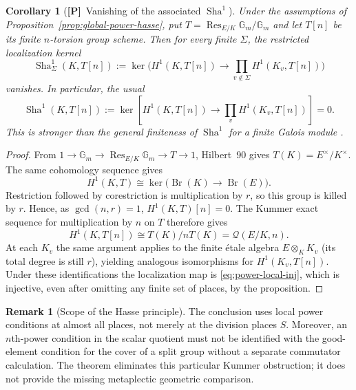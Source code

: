\documentclass[11pt]{article}
\newcommand{\Sha}{\operatorname{Sha}}
\newcommand{\Ptag}{\textnormal{\textbf{[P]}}}
\theoremstyle{plain}
\newtheorem{corollary}[theorem]{Corollary}
\theoremstyle{definition}
\newtheorem{remark}[theorem]{Remark}
\begin{document}
\begin{corollary}[\Ptag\ Vanishing of the associated \texorpdfstring{$\Sha^1$}{Sha-1}]\label{cor:sha-power}
Under the assumptions of Proposition~\ref{prop:global-power-hasse},
put $T=\operatorname{Res}_{E/K}\mathbb G_m/\mathbb G_m$ and
let $T[n]$ be its finite $n$-torsion group scheme. Then for every finite $\Sigma$, the restricted localization kernel
\[\Sha^1_{\Sigma}(K,T[n]):=\ker\bigl(H^1(K,T[n])\to\prod_{v\notin\Sigma}H^1(K_v,T[n])\bigr)\]
vanishes. In particular, the usual
\begin{equation}\label{eq:sha-zero}
\Sha^1(K,T[n]):=
\ker\left[H^1(K,T[n])\longrightarrow
                \prod_v H^1(K_v,T[n])\right]=0.
\end{equation}
This is stronger than the general
finiteness of $\Sha^1$ for a finite Galois module
\cite[Chapter~I, \S4]{MilneADT}.
\end{corollary}
\begin{proof}
From $1\to\mathbb G_m\to\operatorname{Res}_{E/K}\mathbb G_m
\to T\to1$, Hilbert~90 gives $T(K)=E^\times/K^\times$.
The same cohomology sequence gives
\[
 H^1(K,T)\cong
 \ker\bigl(\operatorname{Br}(K)\to\operatorname{Br}(E)\bigr).
\]
Restriction followed by corestriction is multiplication by $r$,
so this group is killed by $r$. Hence, as $\gcd(n,r)=1$,
$H^1(K,T)[n]=0$. The Kummer exact sequence for multiplication
by $n$ on $T$ therefore gives
\[
 H^1(K,T[n])\cong T(K)/nT(K)=\mathcal Q(E/K,n).
\]
At each $K_v$ the same argument applies to the finite \'{e}tale
algebra $E\otimes_K K_v$ (its total degree is still $r$), yielding
analogous isomorphisms for $H^1(K_v,T[n])$.
Under these identifications the localization map is
\eqref{eq:power-local-inj}, which is injective, even after omitting any finite set of places, by the proposition.
\end{proof}

\begin{remark}[Scope of the Hasse principle]\label{rem:sha-limits}
The conclusion uses local power conditions at almost all places,
not merely at the division places $S$. Moreover, an $n$th-power
condition in the scalar quotient must not be identified with the
good-element condition for the cover of a split group without a
separate commutator calculation. The theorem eliminates this
particular Kummer obstruction; it does not provide the missing
metaplectic geometric comparison.
\end{remark}
\end{document}
